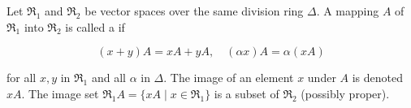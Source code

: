 Let $\mathfrak{R}_1$ and $\mathfrak{R}_2$ be vector spaces over the same division ring $\Delta$. A mapping $A$ of $\mathfrak{R}_1$ into $\mathfrak{R}_2$ is called a  if

$$
(x + y)A = xA + yA, \quad (\alpha x)A = \alpha(xA)
$$

for all $x, y$ in $\mathfrak{R}_1$ and all $\alpha$ in $\Delta$. The image of an element $x$ under $A$ is denoted $xA$. The image set $\mathfrak{R}_1 A = \{ xA \mid x \in \mathfrak{R}_1 \}$ is a subset of $\mathfrak{R}_2$ (possibly proper).

